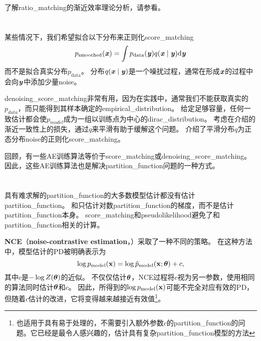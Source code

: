 了解\gls{ratio_matching}的渐近效率理论分析，请参看\cite{Marlin11-small}。


\section{}
\label{sec:denoising_score_matching}
某些情况下，我们希望拟合以下分布来正则化\gls{score_matching}
\begin{equation}
	p_{\text{smoothed}}(\boldsymbol{\mathit{x}}) = \int p_{\text{data}} (\boldsymbol{\mathit{y}}) q( \boldsymbol{\mathit{x}} \mid \boldsymbol{\mathit{y}}) \mathrm{d} \boldsymbol{\mathit{y}}
\end{equation}
而不是拟合真实分布$p_{\text{data}}$。
分布$q(\boldsymbol{\mathit{x}} \mid \boldsymbol{\mathit{y}})$是一个噪扰过程，通常在形成$\boldsymbol{\mathit{x}}$的过程中会向$\boldsymbol{\mathit{y}}$中添加少量\gls{noise}。


\gls{denoising_score_matching}非常有用，因为在实践中，通常我们不能获取真实的$p_{data}$，而只能得到其样本确定的\gls{empirical_distribution}。
给定足够容量，任何一致估计都会使$p_{model}$成为一组以训练点为中心的\gls{dirac_distribution}。
考虑在介绍的渐近一致性上的损失，通过$q$来平滑有助于缓解这个问题。
\cite{Kingma+LeCun-2010}介绍了平滑分布$q$为正态分布\gls{noise}的正则化\gls{score_matching}。


回顾，有一些\gls{AE}训练算法等价于\gls{score_matching}或\gls{denoising_score_matching}。
因此，这些\gls{AE}训练算法也是解决\gls{partition_function}问题的一种方式。


\section{}
\label{sec:noise_contrastive_estimation}
具有难求解的\gls{partition_function}的大多数模型估计都没有估计\gls{partition_function}。
和只估计对数\gls{partition_function}的梯度，而不是估计\gls{partition_function}本身。
\gls{score_matching}和\gls{pseudolikelihood}避免了和\gls{partition_function}相关的计算。 


\textbf{\gls{NCE}}（\textbf{noise-contrastive estimation}，）\citep{Gutmann+Hyvarinen-2010}采取了一种不同的策略。
 在这种方法中，模型估计的\gls{PD}被明确表示为
\begin{equation}
	\log p_{\text{model}} (\mathbf{x}) = \log \tilde{p}_{\text{model}} (\mathbf{x}; \boldsymbol{\theta}) + c,
\end{equation}
其中$c$是$-\log Z(\boldsymbol{\theta})$的近似。
不仅仅估计$\boldsymbol{\theta}$，\gls{NCE}过程将$c$视为另一参数，使用相同的算法同时估计$\boldsymbol{\theta}$和$c$。
因此，所得到的$\log p_{\text{model}}(\mathbf{x})$可能不完全对应有效的\gls{PD}，但随着$c$估计的改进，它将变得越来越接近有效值\footnote{也适用于具有易于处理的，不需要引入额外参数$c$的\gls{partition_function}的问题。它已经是最令人感兴趣的，估计具有复杂\gls{partition_function}模型的方法}。



